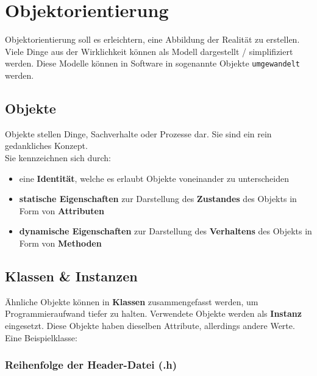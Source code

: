 \section{Objektorientierung}

Objektorientierung soll es erleichtern, eine Abbildung der Realität zu erstellen. 
Viele Dinge aus der Wirklichkeit können als Modell dargestellt / simplifiziert werden. 
Diese Modelle können in Software in sogenannte Objekte \texttt{umgewandelt} werden.

\subsection{Objekte}

Objekte stellen Dinge, Sachverhalte oder Prozesse dar. Sie sind ein rein gedankliches Konzept.\\
Sie kennzeichnen sich durch:

\begin{itemize}[itemsep=1pt, parsep=0pt]
    \item eine \textbf{Identität}, welche es erlaubt Objekte voneinander zu unterscheiden
    \item \textbf{statische Eigenschaften} zur Darstellung des \textbf{Zustandes} des Objekts in Form von \textbf{Attributen}
    \item \textbf{dynamische Eigenschaften} zur Darstellung des \textbf{Verhaltens} des Objekts in Form von \textbf{Methoden}
\end{itemize}


\subsection{Klassen \& Instanzen}

Ähnliche Objekte können in \textbf{Klassen} zusammengefasst werden, um Programmieraufwand tiefer zu halten. 
Verwendete Objekte werden als \textbf{Instanz} eingesetzt. Diese Objekte haben dieselben Attribute, allerdings andere Werte.\\
Eine Beispielklasse:

\vspace{-1em}

\subsubsection{Reihenfolge der Header-Datei (.h)}

